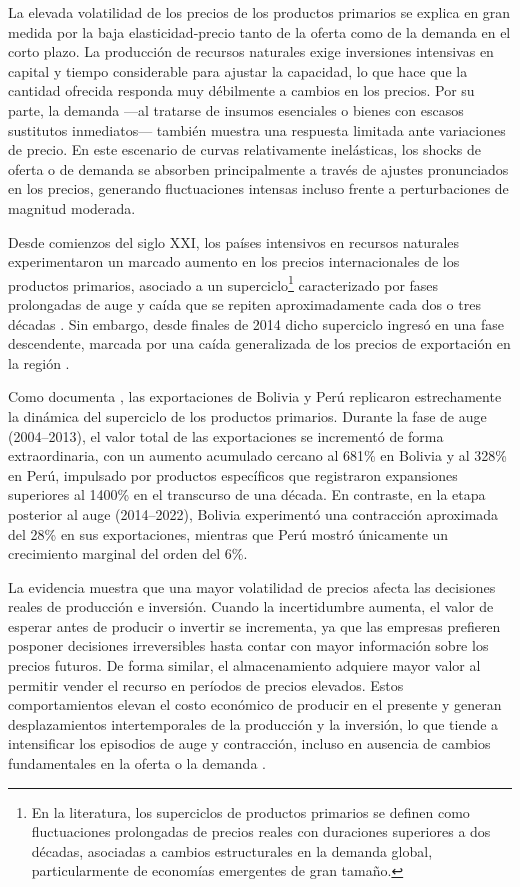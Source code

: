 \documentclass[../../PTFM.tex]{subfiles}
\begin{document}
	La elevada volatilidad de los precios de los productos primarios se explica en gran medida por la baja elasticidad-precio tanto de la oferta como de la demanda en el corto plazo. La producción de recursos naturales exige inversiones intensivas en capital y tiempo considerable para ajustar la capacidad, lo que hace que la cantidad ofrecida responda muy débilmente a cambios en los precios. Por su parte, la demanda —al tratarse de insumos esenciales o bienes con escasos sustitutos inmediatos— también muestra una respuesta limitada ante variaciones de precio. En este escenario de curvas relativamente inelásticas, los shocks de oferta o de demanda se absorben principalmente a través de ajustes pronunciados en los precios, generando fluctuaciones intensas incluso frente a perturbaciones de magnitud moderada.
	
	Desde comienzos del siglo XXI, los países intensivos en recursos naturales experimentaron un marcado aumento en los precios internacionales de los productos primarios, asociado a un superciclo\footnote{En la literatura, los superciclos de productos primarios se definen como fluctuaciones prolongadas de precios reales con duraciones superiores a dos décadas, asociadas a cambios estructurales en la demanda global, particularmente de economías emergentes de gran tamaño.} caracterizado por fases prolongadas de auge y caída que se repiten aproximadamente cada dos o tres décadas \parencite{Fernndez2020}. Sin embargo, desde finales de 2014 dicho superciclo ingresó en una fase descendente, marcada por una caída generalizada de los precios de exportación en la región \parencite{Agramont-Lechn2024}.
	
	Como documenta \textcite{Agramont-Lechn2024}, las exportaciones de Bolivia y Perú replicaron estrechamente la dinámica del superciclo de los productos primarios. Durante la fase de auge (2004--2013), el valor total de las exportaciones se incrementó de forma extraordinaria, con un aumento acumulado cercano al 681\% en Bolivia y al 328\% en Perú, impulsado por productos específicos que registraron expansiones superiores al 1400\% en el transcurso de una década. En contraste, en la etapa posterior al auge (2014--2022), Bolivia experimentó una contracción aproximada del 28\% en sus exportaciones, mientras que Perú mostró únicamente un crecimiento marginal del orden del 6\%.
	
	La evidencia muestra que una mayor volatilidad de precios afecta las decisiones reales de producción e inversión. Cuando la incertidumbre aumenta, el valor de esperar antes de producir o invertir se incrementa, ya que las empresas prefieren posponer decisiones irreversibles hasta contar con mayor información sobre los precios futuros. De forma similar, el almacenamiento adquiere mayor valor al permitir vender el recurso en períodos de precios elevados. Estos comportamientos elevan el costo económico de producir en el presente y generan desplazamientos intertemporales de la producción y la inversión, lo que tiende a intensificar los episodios de auge y contracción, incluso en ausencia de cambios fundamentales en la oferta o la demanda \parencite{Pindyck2004}.
	
\end{document}
